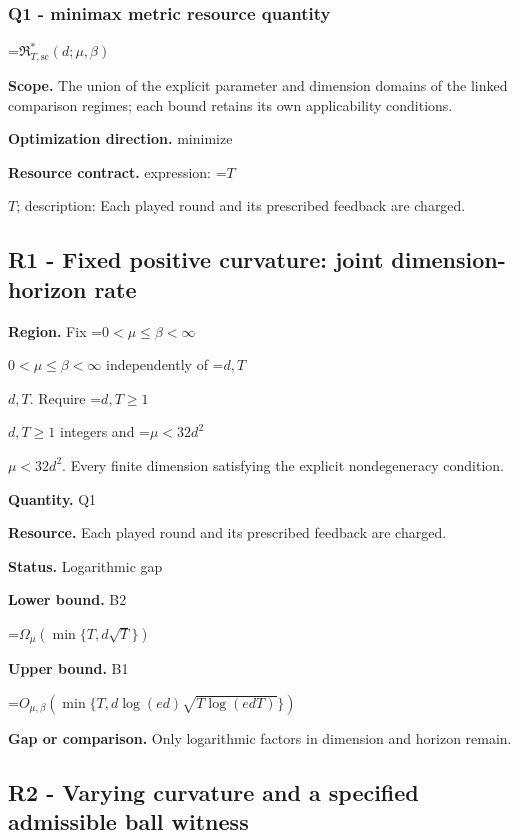\documentclass[10pt,a4paper]{article}
\newcommand{\AtlasMath}[1]{\par\begingroup\centering\setbox0=\hbox{$\displaystyle #1$}\ifdim\wd0>1.4\linewidth\typeout{ATLAS WIDE FORMULA: \the\wd0}\fi\ifdim\wd0>\linewidth\resizebox{\linewidth}{!}{\box0}\else\box0\fi\par\endgroup}
\newcommand{\AtlasInlineMath}[1]{\begingroup\setbox0=\hbox{$#1$}\ifdim\wd0>.4\linewidth\endgroup\AtlasMath{#1}\else\endgroup$#1$\fi}
\begin{document}
\subsubsection{Q1 - minimax metric resource quantity}


\AtlasMath{\mathfrak R^*_{T,\mathrm{sc}}(d;\mu,\beta)}


\textbf{Scope.} The union of the explicit parameter and dimension domains of the linked comparison regimes; each bound retains its own applicability conditions.



\textbf{Optimization direction.} minimize



\textbf{Resource contract.} expression: \AtlasInlineMath{T}; description: Each played round and its prescribed feedback are charged.



\subsection{R1 - Fixed positive curvature: joint dimension-horizon rate}


\textbf{Region.} Fix \AtlasInlineMath{0<\mu\le\beta<\infty} independently of \AtlasInlineMath{d,T}. Require \AtlasInlineMath{d,T\ge1} integers and \AtlasInlineMath{\mu<32d^2}. Every finite dimension satisfying the explicit nondegeneracy condition.



\textbf{Quantity.} Q1



\textbf{Resource.} Each played round and its prescribed feedback are charged.



\textbf{Status.} Logarithmic gap



\textbf{Lower bound.} B2



\AtlasMath{\Omega_{\mu}\!\left(\min\{T,d\sqrt T\}\right)}


\textbf{Upper bound.} B1



\AtlasMath{O_{\mu,\beta}\!\left(\min\{T,d\log(ed)\sqrt{T\log(edT)}\}\right)}


\textbf{Gap or comparison.} Only logarithmic factors in dimension and horizon remain.



\subsection{R2 - Varying curvature and a specified admissible ball witness}
\end{document}
